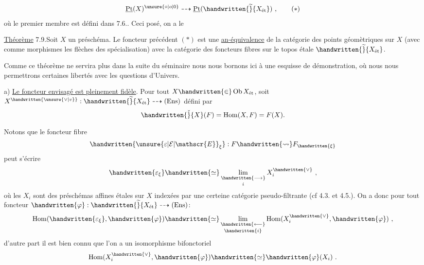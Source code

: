 \begingroup
\makeatletter\tagsleft@true\makeatother
\[
\underline{\mathrm{Pt}}(X)^{\unsure{\circ|o|0}}\dashrightarrow
\underline{\mathrm{Pt}}(\handwritten{\widetilde}{X_{\text{ét}}})\ ,
\tag*{$(*)$}
\]
où le premier membre est défini dans 7.6.. Ceci posé, on a le

\noindent\uline{Théorème} 7.9.\quad Soit $X$ un préschéma. Le foncteur précédent $(*)$ est une \uline{an-équivalence} de la catégorie des points géomètriques sur $X$ (avec comme morphismes les flèches des spécialisation) avec la catégorie des foncteurs fibres sur le topos étale $\handwritten{\widetilde}{X_{\text{ét}}}$.

Comme ce théorème ne servira plus dans la suite du séminaire nous nous bornons ici à une esquisse de démonstration, où nous nous permettrons certaines libertés avec les questions d'Univers.

a) \uline{Le foncteur envisagé est pleinement fidèle}. Pour tout $X\handwritten{\in}\operatorname{Ob} X_{\text{ét}}$, soit $X^{\handwritten{\unsure{\vee|v}}}: \handwritten{\widetilde}{X_{\text{ét}}} \dashrightarrow (\mathrm{Ens})$ défini par
\[
\handwritten{\check}{X}(F) = \operatorname{Hom}(X,F) = F(X).
\]

\noindent Notons que le foncteur fibre
\[
\handwritten{\unsure{\varepsilon|\mathcal{E}|\mathscr{E}}_{\xi}} : F \handwritten{\rightsquigarrow} F_{\handwritten{\xi}}
\]
peut s'écrire
\[
\handwritten{\varepsilon_{\xi}} \handwritten{\simeq} \mathop{\underset{\handwritten{\longrightarrow}}{\mathrm{lim}}}\limits_i X_i^{\handwritten{\vee}}\ ,
\]
où les $X_i$ sont des préschémas affines étales sur $X$ indexées par une certeine catégorie pseudo-filtrante (cf 4.3. et 4.5.). On a donc pour tout foncteur $\handwritten{\varphi}: \handwritten{\widetilde}{X_{\text{ét}}} \dashrightarrow (\mathrm{Ens})$:
\[
\operatorname{Hom}(\handwritten{\varepsilon_{\xi}},\handwritten{\varphi}) \handwritten{\simeq} \mathop{\underset{\handwritten{\longleftarrow}}{\mathrm{lim}}}\limits_{\handwritten{i}} \operatorname{Hom}(X_i^{\handwritten{\vee}},\handwritten{\varphi})\ ,
\]
d'autre part il est bien connu que l'on a un isomorphisme bifonctoriel
\[
\operatorname{Hom}(X_i^{\handwritten{\vee}},\handwritten{\varphi}) \handwritten{\simeq} \handwritten{\varphi}(X_i)\ .
\]

\endgroup

